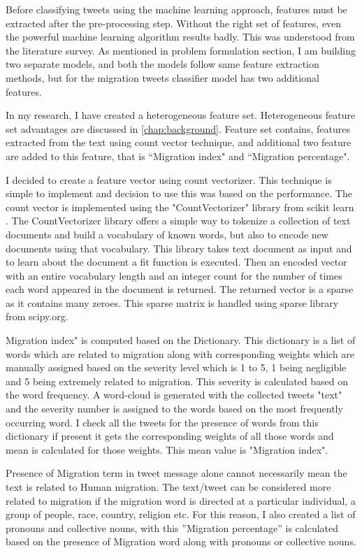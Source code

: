  
Before classifying tweets using the machine learning approach, features must be extracted after the pre-processing step. Without the right set of features, even the powerful machine learning algorithm results badly. This was understood from the literature survey. As mentioned in problem formulation section, I am building two separate models, and both the models follow same feature extraction methods, but for the migration tweets classifier model has two additional features.

In my research, I have created a heterogeneous feature set. Heterogeneous feature set advantages are discussed in \ref{chap:background}. Feature set contains, features extracted from the text using count vector technique, and additional two feature are added to this feature, that is ``Migration index" and ``Migration percentage".   

I decided to create a feature vector using count vectorizer. This technique is simple to implement and decision to use this was based on the performance. The count vector is implemented using the "CountVectorizer" library from scikit learn \cite{scikit-learn}. The CountVectorizer library offers a simple way to tokenize a collection of text documents and build a vocabulary of known words, but also to encode new documents using that vocabulary. This library takes text document as input and to learn about the document a fit function is executed. Then an encoded vector with an entire vocabulary length and an integer count for the number of times each word appeared in the document is returned. The returned vector is a sparse as it contains many zeroes. This sparse matrix is handled using sparse library from scipy.org.

Migration index" is computed based on the Dictionary. This dictionary is a list of words which are related to migration along with corresponding weights which are manually assigned based on the severity level which is 1 to 5, 1 being negligible and 5 being extremely related to migration. This severity is calculated based on the word frequency. A word-cloud is generated with the collected tweets "text" and the severity number is assigned to the words based on the most frequently occurring word.
 I check all the tweets for the presence of words from this dictionary if present it gets the corresponding weights of all those words and mean is calculated for those weights. This mean value is "Migration index". 
 


Presence of Migration term in tweet message alone cannot necessarily mean the text is related
to Human migration. The text/tweet can be considered more related to migration if the migration word is directed at a particular individual, a group of
people, race, country, religion etc. For this reason, I also created a list of pronouns and collective nouns, with this ”Migration percentage” is calculated based on the presence of Migration word along with pronouns or collective nouns.

